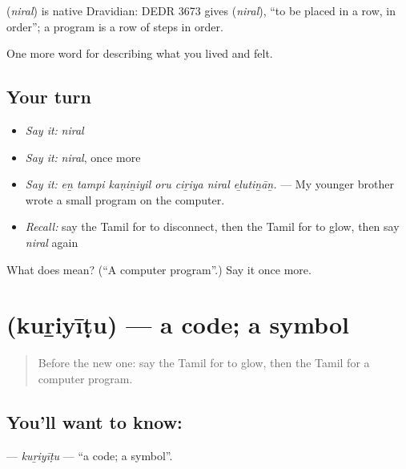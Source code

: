 \begin{cousinweb}
\textbf{} (\emph{niral}) is native Dravidian: DEDR 3673 gives  (\emph{niral}), \textquotedblleft{}to be placed in a row, in order\textquotedblright{}; a program is a row of steps in order.
\end{cousinweb}

\begin{grammarlens}[title={What you've built}]
One more word for describing what you lived and felt.
\end{grammarlens}

\subsection*{Your turn}
\begin{itemize}
\raggedright
  \item \emph{Say it:} \emph{niral}
  \item \emph{Say it:} \emph{niral}, once more
  \item \emph{Say it:} \emph{eṉ tampi kaṇiṉiyil oru ciṟiya niral eḻutiṉāṉ.} — My younger brother wrote a small program on the computer.
  \item \emph{Recall:} say the Tamil for to disconnect, then the Tamil for to glow, then say \emph{niral} again
\end{itemize}

\begin{tcolorbox}[breakable,colback=teal!4,colframe=teal!35!black,title={Before you move on}]
What does  mean? (\textquotedblleft{}A computer program\textquotedblright{}.) Say it once more.
\end{tcolorbox}
\section[\texorpdfstring{\ta{குறியீடு} (kuṟiyīṭu)}{குறியீடு (kuṟiyīṭu)}]{ (kuṟiyīṭu) — a code; a symbol}

\label{lesson:TA-C518-kuriyitu}



\begin{quote}
Before the new one: say the Tamil for to glow, then the Tamil for a computer program.
\end{quote}

\subsection*{You'll want to know: }
\textbf{} — \emph{kuṟiyīṭu} — \textquotedblleft{}a code; a symbol\textquotedblright{}.

